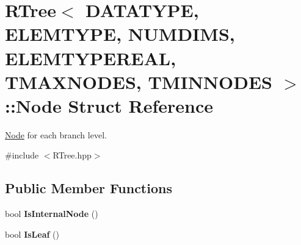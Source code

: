 \hypertarget{struct_r_tree_1_1_node}{\section{\-R\-Tree$<$ \-D\-A\-T\-A\-T\-Y\-P\-E, \-E\-L\-E\-M\-T\-Y\-P\-E, \-N\-U\-M\-D\-I\-M\-S, \-E\-L\-E\-M\-T\-Y\-P\-E\-R\-E\-A\-L, \-T\-M\-A\-X\-N\-O\-D\-E\-S, \-T\-M\-I\-N\-N\-O\-D\-E\-S $>$\-:\-:\-Node \-Struct \-Reference}
\label{struct_r_tree_1_1_node}
}


\hyperlink{struct_r_tree_1_1_node}{\-Node} for each branch level.  




{\ttfamily \#include $<$\-R\-Tree.\-hpp$>$}

\subsection*{\-Public \-Member \-Functions}
\begin{DoxyCompactItemize}
\item 
\hypertarget{struct_r_tree_1_1_node_a6a330138c4d6e2280ac16770cdfcaf09}{bool {\bfseries \-Is\-Internal\-Node} ()}\label{struct_r_tree_1_1_node_a6a330138c4d6e2280ac16770cdfcaf09}

\item 
\hypertarget{struct_r_tree_1_1_node_a3e34e35a8482978d456885d4bac76de4}{bool {\bfseries \-Is\-Leaf} ()}\label{struct_r_tree_1_1_node_a3e34e35a8482978d456885d4bac76de4}

\end{DoxyCompactItemize}

